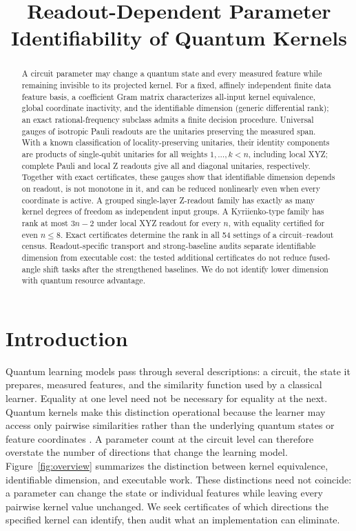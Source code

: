\documentclass[a4paper,twocolumn,11pt,unpublished]{quantumarticle}
\begin{document}
\title{Readout-Dependent Parameter Identifiability of Quantum Kernels}

\begin{abstract}
A circuit parameter may change a quantum state and every measured
feature while remaining invisible to its projected kernel. For a fixed,
affinely independent finite data feature basis, a coefficient Gram
matrix characterizes all-input kernel equivalence, global coordinate
inactivity, and the identifiable dimension (generic differential
rank); an exact rational-frequency subclass admits a finite decision
procedure. Universal gauges of isotropic Pauli readouts are the
unitaries preserving the measured span. With a known classification of
locality-preserving unitaries, their identity components are products
of single-qubit unitaries for all weights $1,\ldots,k<n$, including
local XYZ; complete Pauli and local Z readouts give all and diagonal
unitaries, respectively. Together with exact certificates, these
gauges show that identifiable dimension depends on readout, is not
monotone in it, and can be reduced nonlinearly even when every
coordinate is active. A grouped single-layer Z-readout family has
exactly as many kernel degrees of freedom as independent input groups.
A Kyriienko-type family has rank at most $3n-2$ under local XYZ
readout for every $n$, with equality certified for even $n\le8$. Exact
certificates determine the rank in all 54 settings of a
circuit--readout census. Readout-specific transport and
strong-baseline audits separate identifiable dimension from executable
cost: the tested additional certificates do not reduce fused-angle
shift tasks after the strengthened baselines. We do not identify lower
dimension with quantum resource advantage.
\end{abstract}
\maketitle

\section{Introduction}
Quantum learning models pass through several descriptions: a circuit,
the state it prepares, measured features, and the similarity function
used by a classical learner. Equality at one level need not be necessary
for equality at the next. Quantum kernels make this distinction
operational because the learner may access only pairwise similarities
rather than the underlying quantum states or feature coordinates
\cite{schuld,huang}. A parameter count at the circuit level can therefore
overstate the number of directions that change the learning model.
Figure~\ref{fig:overview} summarizes the distinction between kernel
equivalence, identifiable dimension, and executable work.
These distinctions need not coincide: a parameter can change the state
or individual features while leaving every pairwise kernel value
unchanged. We seek certificates of which directions the specified
kernel can identify, then audit what an implementation can eliminate.
\end{document}

